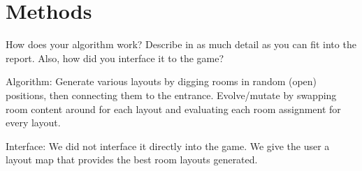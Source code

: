 \section{Methods}
\label{04}

How does your algorithm work? Describe in as much detail as you can fit into the report. Also, how did you interface it to the game?

Algorithm: Generate various layouts by digging rooms in random (open) positions, then connecting them to the entrance. Evolve/mutate by swapping room content around for each layout and evaluating each room assignment for every layout.

Interface: We did not interface it directly into the game. We give the user a layout map that provides the best room layouts generated.